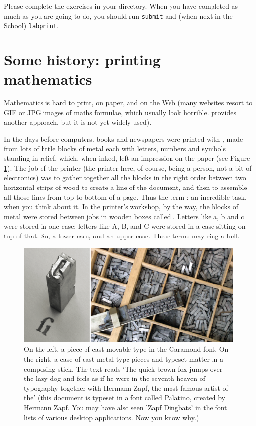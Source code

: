 \begin{refsection}
Please complete the exercises in your  directory. When you have completed as much as you are going to do, you should run \texttt{submit} and (when next in the School) \texttt{labprint}.

\section{Some history: printing mathematics}

Mathematics is hard to print, on paper, and on the Web (many websites resort to GIF or JPG images of maths formulae, which usually look horrible.  provides another approach, but it is not yet widely used).

In the days before computers, books and newspapers were printed with , made from lots of little blocks of metal each with letters, numbers and symbols standing in relief, which, when inked, left an impression on the paper (see Figure \ref{figure:movabletype}). The job of the printer (the printer here, of course, being a person, not a bit of electronics) was to gather together all the blocks in the right order between two horizontal strips of wood to create a line of the document, and then to assemble all those lines from top to bottom of a page. Thus the term : an incredible task, when you think about it. In the printer's workshop, by the way, the blocks of metal were stored between jobs in wooden boxes called . Letters like a, b and c were stored in one case; letters like A, B, and C were stored in a case sitting on top of that. So, a lower case, and an upper case. These terms may ring a bell.

\begin{figure}
\centerline{\includegraphics[width=12cm]{images/movable-type.png}}
\caption{On the left, a piece of cast movable type in the Garamond font. On the right, a case of cast metal type pieces and typeset matter in a composing stick. The text reads `The quick brown fox jumps over the lazy dog and feels as if he were in the seventh heaven of typography together with Hermann Zapf, the most famous artist of the' (this document is typeset in a font called Palatino, created by Hermann Zapf. You may have also seen 'Zapf Dingbats' in the font lists of various desktop applications. Now you know why.)} \label{figure:movabletype}
\end{figure}


\end{refsection}
